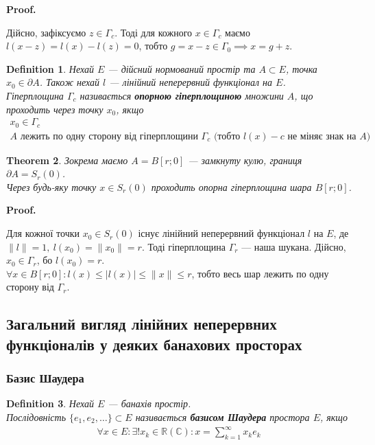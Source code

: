 \documentclass[a4paper, 10pt]{article}
\makeatletter
\theoremstyle{theoremdd}
\newtheorem{theorem}{Theorem}[subsection]
\theoremstyle{theoremdd}
\newtheorem{definition}[theorem]{Definition}
\theoremstyle{theoremdd}
\theoremstyle{theoremdd}
\theoremstyle{theoremdd}
\theoremstyle{theoremdd}
\theoremstyle{theoremdd}
\theoremstyle{theoremdd}
\renewenvironment{proof}[1][Proof.\\]{\par
\pushQED{\hfill \qed}%
\normalfont \topsep6\p@\@plus6\p@\relax
\trivlist
\item\relax
{\bfseries
#1\@addpunct{.}}\hspace\labelsep\ignorespaces
}{%
\popQED\endtrivlist\@endpefalse
}
\makeatother
\begin{document}
\begin{proof}
Дійсно, зафіксуємо $z \in \Gamma_c$. Тоді для кожного $x \in \Gamma_c$ маємо $l(x-z) = l(x) - l(z) = 0$, тобто $g = x-z \in \Gamma_0 \implies x = g +z$.
\end{proof}

\begin{definition}
Нехай $E$ --- дійсний нормований простір та $A \subset E$, точка $x_0 \in \partial A$. Також нехай $l$ --- лінійний неперервний функціонал на $E$.\\
Гіперплощина $\Gamma_c$ називається \textbf{опорною гіперплощиною} множини $A$, що проходить через точку $x_0$, якщо
\begin{align*}
x_0 \in \Gamma_c \\
A \text{ лежить по одну сторону від гіперплощини } \Gamma_c \text{ (тобто $l(x) - c$ не міняє знак на $A$)}
\end{align*}
\end{definition}

\begin{theorem}
Зокрема маємо $A = B[r;0]$ --- замкнуту кулю, границя $\partial A = S_r(0)$.\\
Через будь-яку точку $x \in S_r(0)$ проходить опорна гіперплощина шара $B[r;0]$.
\end{theorem}

\begin{proof}
Для кожної точки $x_0 \in S_r(0)$ існує лінійний неперервний функціонал $l$ на $E$, де $\|l\| = 1,\ l(x_0) = \|x_0\| = r$. Тоді гіперплощина $\Gamma_r$ --- наша шукана. Дійсно, $x_0 \in \Gamma_r$, бо $l(x_0) = r$.\\
$\forall x \in B[r;0]: l(x) \leq |l(x)| \leq \|x\| \leq r$, тобто весь шар лежить по одну сторону від $\Gamma_r$.
\end{proof}
\fi

\subsection{Загальний вигляд лінійних неперервних функціоналів у деяких банахових просторах}
\subsubsection{Базис Шаудера}
\begin{definition}
Нехай $E$ --- банахів простір.\\
Послідовність $\{e_1,e_2,\dots\} \subset E$ називається \textbf{базисом Шаудера} простора $E$, якщо
\begin{align*}
\forall x \in E: \exists ! x_k \in \mathbb{R} (\mathbb{C}): x = \displaystyle\sum_{k=1}^\infty x_k e_k
\end{align*}
\end{definition}
\end{document}
